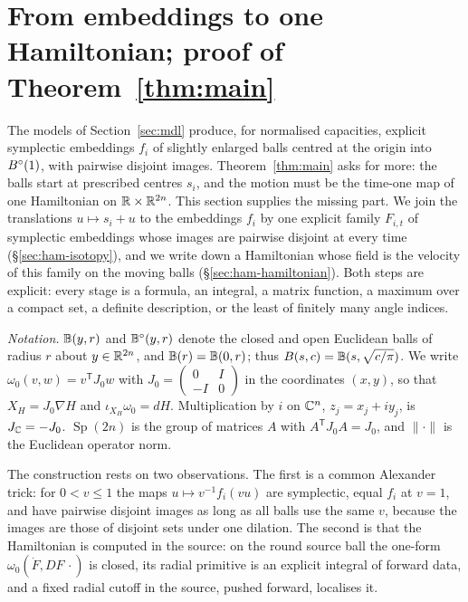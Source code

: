 \section{From embeddings to one Hamiltonian; proof of Theorem~\texorpdfstring{\ref{thm:main}}{C}}\label{sec:ham}

The models of Section~\ref{sec:mdl} produce, for normalised capacities, explicit symplectic
embeddings $f_i$ of slightly enlarged balls centred at the origin into $B^{\circ}(1)$, with pairwise disjoint images.
Theorem~\ref{thm:main} asks for more: the balls start at prescribed centres $s_i$, and the motion must be the
time-one map of one Hamiltonian on $\mathbb{R}\times\mathbb{R}^{2n}$. This section supplies the missing part. We join the
translations $u\mapsto s_i+u$ to the embeddings $f_i$ by one explicit family $F_{i,t}$ of symplectic embeddings
whose images are pairwise disjoint at every time (\S\ref{sec:ham-isotopy}), and we write down a Hamiltonian whose
field is the velocity of this family on the moving balls (\S\ref{sec:ham-hamiltonian}). Both steps are explicit:
every stage is a formula, an integral, a matrix function, a maximum over a compact set, a definite description, or
the least of finitely many angle indices.

\emph{Notation.} $\mathbb{B}(y,r)$ and $\mathbb{B}^\circ(y,r)$ denote the closed and open Euclidean balls of radius $r$ about
$y\in\mathbb{R}^{2n}$, and $\mathbb{B}(r)=\mathbb{B}(0,r)$; thus $B(s,c)=\mathbb{B}(s,\sqrt{c/\pi})$. We write
$\omega_0(v,w)=v^{\mathsf T}J_0w$ with $J_0=\left(\begin{smallmatrix}0&I\\-I&0\end{smallmatrix}\right)$ in the
coordinates $(x,y)$, so that $X_H=J_0\nabla H$ and $\iota_{X_H}\omega_0=dH$. Multiplication by $i$ on
$\mathbb{C}^n$, $z_j=x_j+iy_j$, is $J_{\mathbb{C}}=-J_0$. $\operatorname{Sp}(2n)$ is the group of matrices $A$ with
$A^{\mathsf T}J_0A=J_0$, and $\|\cdot\|$ is the Euclidean operator norm.

The construction rests on two observations. The first is a common Alexander trick: for $0<v\le1$ the maps
$u\mapsto v^{-1}f_i(vu)$ are symplectic, equal $f_i$ at $v=1$, and have pairwise disjoint images as long as all
balls use the same $v$, because the images are those of disjoint sets under one dilation. The second is that the
Hamiltonian is computed in the source: on the round source ball the one-form $\omega_0(\dot F,DF\,\cdot)$ is
closed, its radial primitive is an explicit integral of forward data, and a fixed radial cutoff in the source,
pushed forward, localises it.

